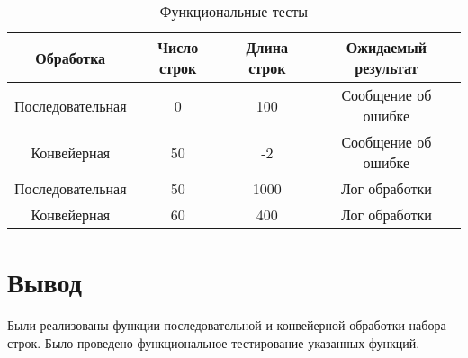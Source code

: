 \begin{table}[h]
	\begin{center}
		\begin{threeparttable}
		\captionsetup{justification=raggedright,singlelinecheck=off}
		\caption{\label{tbl:func_test} Функциональные тесты}
		\begin{tabular}{|c|c|c|c|}
			\hline
			Обработка & Число строк & Длина строк & Ожидаемый результат \\ 
			\hline
			Последовательная & 0 & 100 & Сообщение об ошибке \\
			\hline
			Конвейерная & 50 & -2 & Сообщение об ошибке \\
			\hline
			Последовательная & 50 & 1000 & Лог обработки \\
			\hline
			Конвейерная & 60 & 400 & Лог обработки \\
			\hline
		\end{tabular}
		\end{threeparttable}
	\end{center}
	
\end{table}

\section{Вывод}

Были реализованы функции последовательной и конвейерной обработки набора строк. Было проведено функциональное тестирование указанных функций.